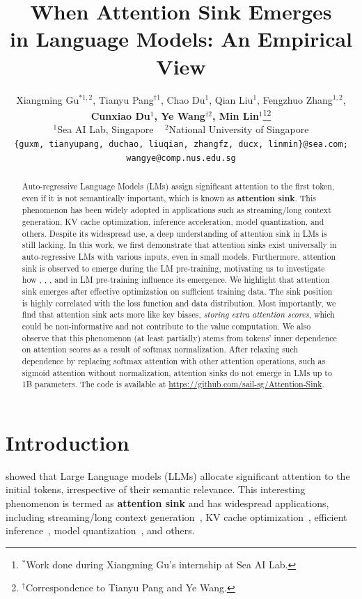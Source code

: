 \documentclass{article} \usepackage{iclr2025_conference,times}
\title{When Attention Sink Emerges\\in Language Models: An Empirical View}
\author{
    \!\!Xiangming Gu$^{*1,2}$, Tianyu Pang$^{\dagger1}$, Chao Du$^{1}$, Qian Liu$^{1}$, Fengzhuo Zhang$^{1,2}$, \\
    \textbf{Cunxiao Du$^{1}$, Ye Wang$^{\dagger2}$, Min Lin$^{1}$}\thanks{$^*$Work done during Xiangming Gu’s internship at Sea AI Lab.}\thanks{$^{\dagger}$Correspondence to Tianyu Pang and Ye Wang.}\\
    $^{1}$Sea AI Lab, Singapore \,\,\,\,\,$^{2}$National University of Singapore \\
    \footnotesize{\texttt{\{guxm, tianyupang, duchao, liuqian, zhangfz, ducx, linmin\}@sea.com;}} \\
    \footnotesize{\texttt{wangye@comp.nus.edu.sg}}
}
\begin{document}
\maketitle





\begin{abstract}
    Auto-regressive Language Models (LMs) assign significant attention to the first token, even if it is not semantically important, which is known as \textbf{attention sink}. This phenomenon has been widely adopted in applications such as streaming/long context generation, KV cache optimization, inference acceleration, model quantization, and others. Despite its widespread use, a deep understanding of attention sink in LMs is still lacking. In this work, we first demonstrate that attention sinks exist universally in auto-regressive LMs with various inputs, even in small models. Furthermore, attention sink is observed to emerge during the LM pre-training, motivating us to investigate how {\color{cc1}{optimization}}, {\color{cc2}{data distribution}}, {\color{cc3}{loss function}}, and {\color{cc4}{model architecture}} in LM pre-training influence its emergence. We highlight that attention sink emerges after effective optimization on sufficient training data. The sink position is highly correlated with the loss function and data distribution. Most importantly, we find that attention sink acts more like key biases, \emph{storing extra attention scores}, which could be non-informative and not contribute to the value computation. We also observe that this phenomenon (at least partially) stems from tokens' inner dependence on attention scores as a result of softmax normalization. After relaxing such dependence by replacing softmax attention with other attention operations, such as sigmoid attention without normalization, attention sinks do not emerge in LMs up to 1B parameters. The code is available at \href{https://github.com/sail-sg/Attention-Sink}{https://github.com/sail-sg/Attention-Sink}.  
\end{abstract}



 \section{Introduction}




\citet{xiao2023efficient} showed that Large Language models (LLMs) allocate significant attention to the initial tokens, irrespective of their semantic relevance. This interesting phenomenon is termed as \textbf{attention sink} and has widespread applications, including streaming/long context generation~\citep{xiao2023efficient,han2024lm,yang2024seed}, KV cache optimization~\citep{ge2023model,wan2024look,wu2024layer}, efficient inference~\citep{zhang2024q,chen2024image}, model quantization~\citep{liu2024intactkv,huang2024slim}, and others.
\end{document}

